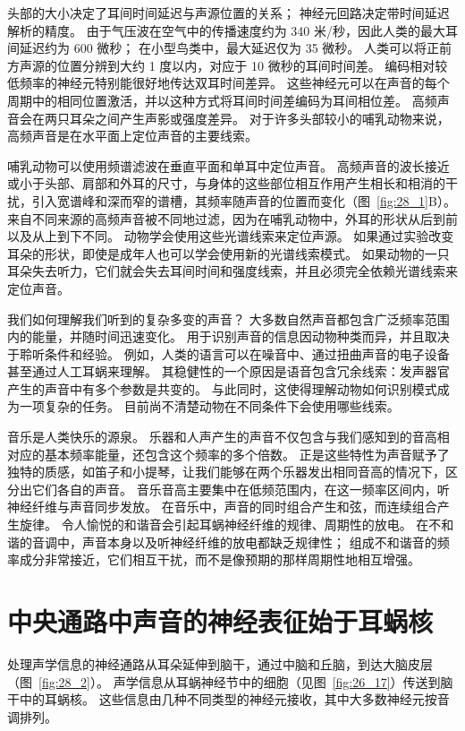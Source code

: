 头部的大小决定了耳间时间延迟与声源位置的关系； 神经元回路决定带时间延迟解析的精度。
由于气压波在空气中的传播速度约为 340 米/秒，因此人类的最大耳间延迟约为 600 微秒；
在小型鸟类中，最大延迟仅为 35 微秒。
人类可以将正前方声源的位置分辨到大约 1 度以内，对应于 10 微秒的耳间时间差。
编码相对较低频率的神经元特别能很好地传达双耳时间差异。
这些神经元可以在声音的每个周期中的相同位置激活，并以这种方式将耳间时间差编码为耳间相位差。
高频声音会在两只耳朵之间产生声影或强度差异。
对于许多头部较小的哺乳动物来说，高频声音是在水平面上定位声音的主要线索。


哺乳动物可以使用频谱滤波在垂直平面和单耳中定位声音。
高频声音的波长接近或小于头部、肩部和外耳的尺寸，与身体的这些部位相互作用产生相长和相消的干扰，引入宽谱峰和深而窄的谱槽，其频率随声音的位置而变化（图~\ref{fig:28_1}B）。
来自不同来源的高频声音被不同地过滤，因为在哺乳动物中，外耳的形状从后到前以及从上到下不同。
动物学会使用这些光谱线索来定位声源。
如果通过实验改变耳朵的形状，即使是成年人也可以学会使用新的光谱线索模式。
如果动物的一只耳朵失去听力，它们就会失去耳间时间和强度线索，并且必须完全依赖光谱线索来定位声音。


我们如何理解我们听到的复杂多变的声音？
大多数自然声音都包含广泛频率范围内的能量，并随时间迅速变化。
用于识别声音的信息因动物种类而异，并且取决于聆听条件和经验。
例如，人类的语言可以在噪音中、通过扭曲声音的电子设备甚至通过人工耳蜗来理解。
其稳健性的一个原因是语音包含冗余线索：发声器官产生的声音中有多个参数是共变的。
与此同时，这使得理解动物如何识别模式成为一项复杂的任务。
目前尚不清楚动物在不同条件下会使用哪些线索。


音乐是人类快乐的源泉。
乐器和人声产生的声音不仅包含与我们感知到的音高相对应的基本频率能量，还包含这个频率的多个倍数。
正是这些特性为声音赋予了独特的质感，如笛子和小提琴，让我们能够在两个乐器发出相同音高的情况下，区分出它们各自的声音。
音乐音高主要集中在低频范围内，在这一频率区间内，听神经纤维与声音同步发放。
在音乐中，声音的同时组合产生和弦，而连续组合产生旋律。
令人愉悦的和谐音会引起耳蜗神经纤维的规律、周期性的放电。
在不和谐的音调中，声音本身以及听神经纤维的放电都缺乏规律性；
组成不和谐音的频率成分非常接近，它们相互干扰，而不是像预期的那样周期性地相互增强。



\section{中央通路中声音的神经表征始于耳蜗核}

处理声学信息的神经通路从耳朵延伸到脑干，通过中脑和丘脑，到达大脑皮层（图~\ref{fig:28_2}）。
声学信息从耳蜗神经节中的细胞（见图~\ref{fig:26_17}）传送到脑干中的耳蜗核。
这些信息由几种不同类型的神经元接收，其中大多数神经元按音调排列。


